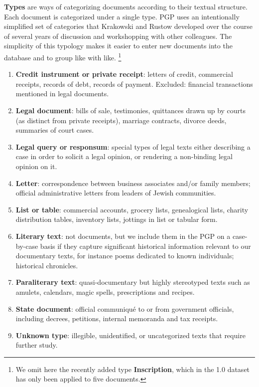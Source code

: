 \documentclass{article}
\begin{document}
\textbf{Types} are ways of categorizing documents according to their textual structure. Each document is categorized under a single type. PGP uses an intentionally simplified set of categories that Krakowski and Rustow developed over the course of several years of discussion and workshopping with other colleagues. The simplicity of this typology makes it easier to enter new documents into the database and to group like with like. \footnote{We omit here the recently added type \textbf{Inscription}, which in the 1.0 dataset has only been applied to five documents.}

\begin{enumerate}
    \item     \textbf{Credit instrument or private receipt}: letters of credit, commercial receipts, records of debt, records of payment. Excluded: financial transactions mentioned in legal documents.
    \item \textbf{Legal document}: bills of sale, testimonies, quittances drawn up by courts (as distinct from private receipts), marriage contracts, divorce deeds, summaries of court cases.
    \item \textbf{Legal query or responsum}: special types of legal texts either describing a case in order to solicit a legal opinion, or rendering a non-binding legal opinion on it.
    \item \textbf{Letter}: correspondence between business associates and/or family members; official administrative letters from leaders of Jewish communities.
    \item \textbf{List or table}: commercial accounts, grocery lists, genealogical lists, charity distribution tables, inventory lists, jottings in list or tabular form.
    \item \textbf{Literary text}: not documents, but we include them in the PGP on a case-by-case basis if they capture significant historical information relevant to our documentary texts, for instance poems dedicated to known individuals; historical chronicles.
    \item \textbf{Paraliterary text}: quasi-documentary but highly stereotyped texts such as amulets, calendars, magic spells, prescriptions and recipes.
    \item \textbf{State document}: official communiqué to or from government officials, including decrees, petitions, internal memoranda and tax receipts.
    \item \textbf{Unknown type}: illegible, unidentified, or uncategorized texts that require further study.
\end{enumerate}
\end{document}
